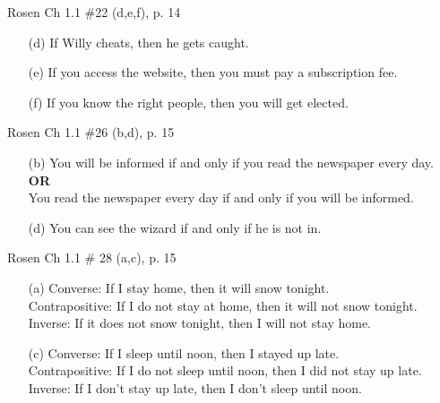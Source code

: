 \documentclass[12pt,addpoints]{exam}
\begin{document}
\begin{questions}
\question[9] Rosen Ch 1.1 \#22 (d,e,f), p. 14
    \ifprintanswers
        \vspace{-15pt}
    \fi
    \begin{solution}
    	\begin{itemize}[itemsep=0pt,parsep=0pt,topsep=0pt,partopsep=0pt]
    		\item[(d)] If Willy cheats, then he gets caught.
    		\item[(e)] If you access the website, then you must pay a subscription fee.
    		\item[(f)] If you know the right people, then you will get elected.
		\end{itemize}
	\end{solution}
	

\question[4] Rosen Ch 1.1 \#26 (b,d), p. 15
    \ifprintanswers
        \vspace{-15pt}
    \fi
    \begin{solution}
        \begin{itemize}[itemsep=0pt,parsep=0pt,topsep=0pt,partopsep=0pt]
        	\item[(b)] You will be informed if and only if you read the newspaper every day. \textbf{OR} \\ You read the newspaper every day if and only if you will be informed.
        	\item[(d)] You can see the wizard if and only if he is not in.
        \end{itemize}
    \end{solution}


\question[6] Rosen Ch 1.1 \# 28 (a,c), p. 15
    \ifprintanswers
        \vspace{-15pt}
    \fi
    \begin{solution}
        \begin{itemize}[itemsep=0pt,parsep=0pt,topsep=0pt,partopsep=0pt]
        	\item[(a)] Converse: If I stay home, then it will snow tonight. \\
        		Contrapositive: If I do not stay at home, then it will not snow tonight. \\
        		Inverse: If it does not snow tonight, then I will not stay home.
        	\item[(c)] Converse: If I sleep until noon, then I stayed up late. \\
        		Contrapositive: If I do not sleep until noon, then I did not stay up late. \\
        		Inverse: If I don't stay up late, then I don't sleep until noon.
        \end{itemize}
    \end{solution}



\end{questions}
\end{document}
